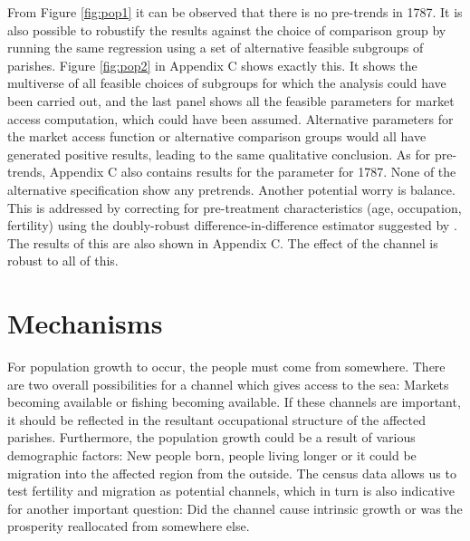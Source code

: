 \documentclass[11pt]{article}
\begin{document}
From Figure \ref{fig:pop1} it can be observed that there is no pre-trends in 1787. It is also possible to robustify the results against the choice of comparison group by running the same regression using a set of alternative feasible subgroups of parishes. Figure \ref{fig:pop2} in Appendix C shows exactly this. It shows the multiverse of all feasible choices of subgroups \citep{Steegen2016multiverse} for which the analysis could have been carried out, and the last panel shows all the feasible parameters for market access computation, which could have been assumed. Alternative parameters for the market access function or alternative comparison groups would all have generated positive results, leading to the same qualitative conclusion. As for pre-trends, Appendix C also contains results for the parameter for 1787. None of the alternative specification show any pretrends. Another potential worry is balance. This is addressed by correcting for pre-treatment characteristics (age, occupation, fertility) using the doubly-robust difference-in-difference estimator suggested by \cite{Callaway2021did}. The results of this are also shown in Appendix C. The effect of the channel is robust to all of this.

\FloatBarrier
\section{Mechanisms}



For population growth to occur, the people must come from somewhere. There are two overall possibilities for a channel which gives access to the sea: Markets becoming available or fishing becoming available. If these channels are important, it should be reflected in the resultant occupational structure of the affected parishes. Furthermore, the population growth could be a result of various demographic factors: New people born, people living longer or it could be migration into the affected region from the outside. The census data allows us to test fertility and migration as potential channels, which in turn is also indicative for another important question: Did the channel cause intrinsic growth or was the prosperity reallocated from somewhere else. 
\end{document}
